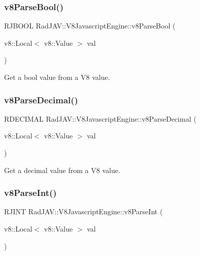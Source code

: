 \subsubsection{\texorpdfstring{v8\+Parse\+Bool()}{v8ParseBool()}}
{\footnotesize\ttfamily R\+J\+B\+O\+OL Rad\+J\+A\+V\+::\+V8\+Javascript\+Engine\+::v8\+Parse\+Bool (\begin{DoxyParamCaption}\item[{v8\+::\+Local$<$ v8\+::\+Value $>$}]{val }\end{DoxyParamCaption})}



Get a bool value from a V8 value. 

\mbox{\label{class_rad_j_a_v_1_1_v8_javascript_engine_a4be2d9f0eb007b9bff3b8cde3dca41ec}} 
\subsubsection{\texorpdfstring{v8\+Parse\+Decimal()}{v8ParseDecimal()}}
{\footnotesize\ttfamily R\+D\+E\+C\+I\+M\+AL Rad\+J\+A\+V\+::\+V8\+Javascript\+Engine\+::v8\+Parse\+Decimal (\begin{DoxyParamCaption}\item[{v8\+::\+Local$<$ v8\+::\+Value $>$}]{val }\end{DoxyParamCaption})}



Get a decimal value from a V8 value. 

\mbox{\label{class_rad_j_a_v_1_1_v8_javascript_engine_a84c962d7d592cb90fb2b5650c1c4ebac}} 
\subsubsection{\texorpdfstring{v8\+Parse\+Int()}{v8ParseInt()}}
{\footnotesize\ttfamily R\+J\+I\+NT Rad\+J\+A\+V\+::\+V8\+Javascript\+Engine\+::v8\+Parse\+Int (\begin{DoxyParamCaption}\item[{v8\+::\+Local$<$ v8\+::\+Value $>$}]{val }\end{DoxyParamCaption})}




